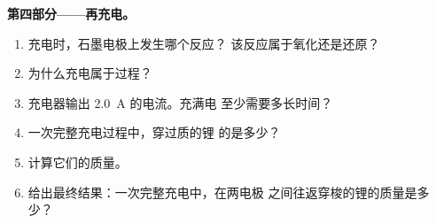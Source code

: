 \begin{problem}
\medskip
\noindent\textbf{第四部分——再充电。}
\begin{enumerate}[resume]
  \item 充电时，石墨电极上发生哪个反应？
        该反应属于氧化还是还原？
  \item 为什么充电属于过程？
  \item 充电器输出 \qty{2.0}{A} 的电流。充满电
        至少需要多长时间？
  \item 一次完整充电过程中，穿过质的锂
        的是多少？
  \item 计算它们的质量。
  \item 给出最终结果：一次完整充电中，在两电极
        之间往返穿梭的锂的质量是多少？
\end{enumerate}
\end{problem}
